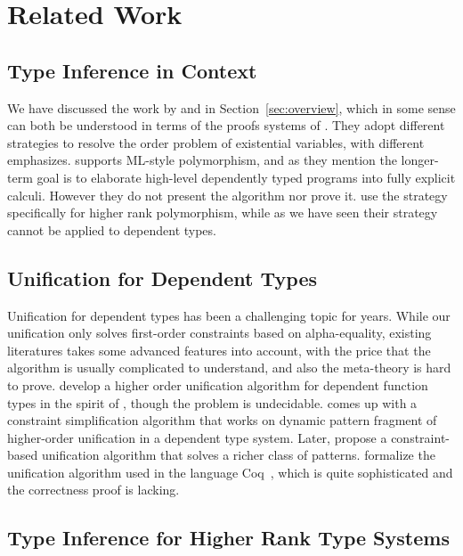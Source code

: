\section{Related Work}

\subsection{Type Inference in Context}

We have discussed the work by \citet{gundry2010type} and
\citet{dunfield2013complete} in Section~\ref{sec:overview}, which in some sense
can both be understood in terms of the proofs systems of
\citet{miller1992unification}. They adopt different strategies to resolve the
order problem of existential variables, with different emphasizes.
\citet{gundry2010type} supports ML-style polymorphism, and as they mention the
longer-term goal is to elaborate high-level dependently typed programs into
fully explicit calculi. However they do not present the algorithm nor prove it.
\citet{dunfield2013complete} use the strategy specifically for higher rank
polymorphism, while as we have seen their strategy cannot be applied to dependent types.

\subsection{Unification for Dependent Types}

Unification for dependent types has been a challenging topic for years. While
our unification only solves first-order constraints based on alpha-equality,
existing literatures takes some advanced features into account, with the price
that the algorithm is usually complicated to understand, and also the
meta-theory is hard to prove. \citet{elliott1989higher} develop a higher order
unification algorithm for dependent function types in the spirit of
\citet{huet1975unification}, though the problem is undecidable.
\citet{reed2009higher} comes up with a constraint simplification algorithm that
works on dynamic pattern fragment of higher-order unification in a
dependent type system.
Later, \citet{abel2011higher} propose a constraint-based unification algorithm
that solves a richer class of patterns.
\citet{ziliani2015unification} formalize the unification algorithm used in the
language Coq~\citep{coqsite}, which is quite sophisticated and the correctness
proof is lacking.

\subsection{Type Inference for Higher Rank Type Systems}

